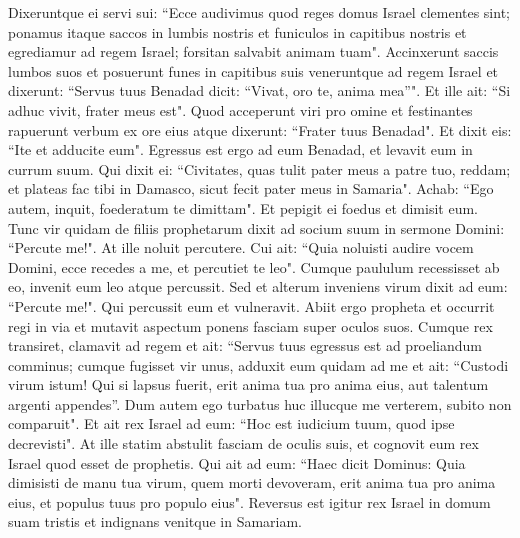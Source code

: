 \begin{biblechapter}
\verse Dixeruntque ei servi sui: “Ecce audivimus quod reges domus Israel clementes sint; ponamus itaque saccos in lumbis nostris et funiculos in capitibus nostris et egrediamur ad regem Israel; forsitan salvabit animam tuam". 
\verse Accinxerunt saccis lumbos suos et posuerunt funes in capitibus suis veneruntque ad regem Israel et dixerunt: “Servus tuus Benadad dicit: “Vivat, oro te, anima mea”". Et ille ait: “Si adhuc vivit, frater meus est". 
\verse Quod acceperunt viri pro omine et festinantes rapuerunt verbum ex ore eius atque dixerunt: “Frater tuus Benadad". Et dixit eis: “Ite et adducite eum". Egressus est ergo ad eum Benadad, et levavit eum in currum suum. 
\verse Qui dixit ei: “Civitates, quas tulit pater meus a patre tuo, reddam; et plateas fac tibi in Damasco, sicut fecit pater meus in Samaria". Achab: “Ego autem, inquit, foederatum te dimittam". Et pepigit ei foedus et dimisit eum. 
\verse Tunc vir quidam de filiis prophetarum dixit ad socium suum in sermone Domini: “Percute me!". At ille noluit percutere. 
\verse Cui ait: “Quia noluisti audire vocem Domini, ecce recedes a me, et percutiet te leo". Cumque paululum recessisset ab eo, invenit eum leo atque percussit. 
\verse Sed et alterum inveniens virum dixit ad eum: “Percute me!". Qui percussit eum et vulneravit.  
\verse Abiit ergo propheta et occurrit regi in via et mutavit aspectum ponens fasciam super oculos suos. 
\verse Cumque rex transiret, clamavit ad regem et ait: “Servus tuus egressus est ad proeliandum comminus; cumque fugisset vir unus, adduxit eum quidam ad me et ait: “Custodi virum istum! Qui si lapsus fuerit, erit anima tua pro anima eius, aut talentum argenti appendes”. 
\verse Dum autem ego turbatus huc illucque me verterem, subito non comparuit". Et ait rex Israel ad eum: “Hoc est iudicium tuum, quod ipse decrevisti". 
\verse At ille statim abstulit fasciam de oculis suis, et cognovit eum rex Israel quod esset de prophetis. 
\verse Qui ait ad eum: “Haec dicit Dominus: Quia dimisisti de manu tua virum, quem morti devoveram, erit anima tua pro anima eius, et populus tuus pro populo eius". 
\verse Reversus est igitur rex Israel in domum suam tristis et indignans venitque in Samariam. 
\end{biblechapter}

